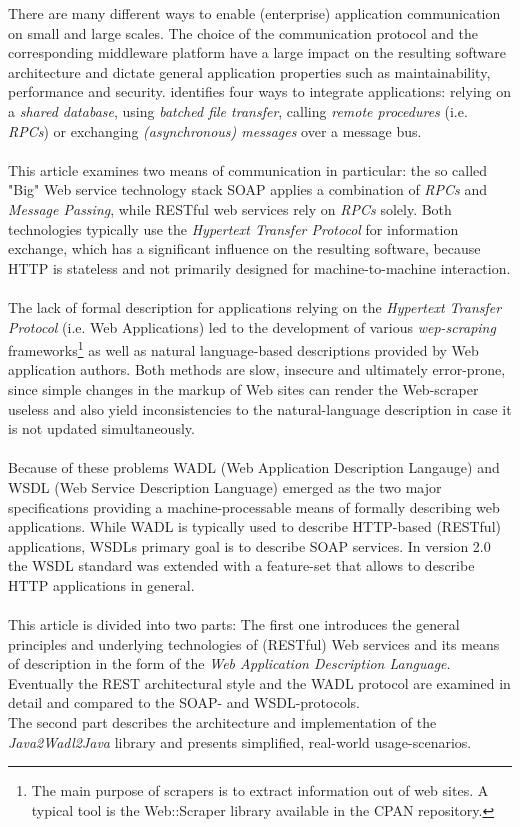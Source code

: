 There are many different ways to enable (enterprise) application communication on small and large scales. The choice of the communication protocol and the corresponding middleware platform have a large impact on the resulting software architecture and dictate general application properties such as maintainability, performance and security. \cite{BIGREST} identifies four ways to integrate applications: relying on a \emph{shared database}, using \emph{batched file transfer}, calling \emph{remote procedures} (i.e. \emph{RPCs}) or exchanging \emph{(asynchronous) messages} over a message bus.
\\ \\
This article examines two means of communication in particular: the so called "Big" Web service technology stack SOAP applies a combination of \emph{RPCs} and \emph{Message Passing}, while RESTful web services rely on \emph{RPCs} solely. \cite{WEBDSGN} Both technologies typically use the \emph{Hypertext Transfer Protocol} for information exchange, which has a significant influence on the resulting software, because HTTP is stateless and not primarily designed for machine-to-machine interaction. 
\\ \\
The lack of formal description for applications relying on the \emph{Hypertext Transfer Protocol} (i.e. Web Applications) led to the development of various \emph{wep-scraping} frameworks\footnote{The main purpose of scrapers is to extract information out of web sites. A typical tool is the Web::Scraper library available in the CPAN repository.} as well as natural language-based descriptions provided by Web application authors. Both methods are slow, insecure and ultimately error-prone, since simple changes in the markup of Web sites can render the Web-scraper useless and also yield inconsistencies to the natural-language description in case it is not updated simultaneously. \cite{WADLWSDL}
\\ \\
Because of these problems WADL (Web Application Description Langauge) and WSDL (Web Service Description Language) emerged as the two major specifications providing a machine-processable means of formally describing web applications. While WADL is typically used to describe HTTP-based (RESTful) applications, WSDLs primary goal is to describe SOAP services. In version 2.0 the WSDL standard was extended with a feature-set that allows to describe HTTP applications in general.
\\ \\
This article is divided into two parts: The first one introduces the general principles and underlying technologies of (RESTful) Web services and its means of description in the form of the \emph{Web Application Description Language}. Eventually the REST architectural style and the WADL protocol are examined in detail and compared to the SOAP- and WSDL-protocols.
\\
The second part describes the architecture and implementation of the \emph{Java2Wadl2Java} library and presents simplified, real-world usage-scenarios.